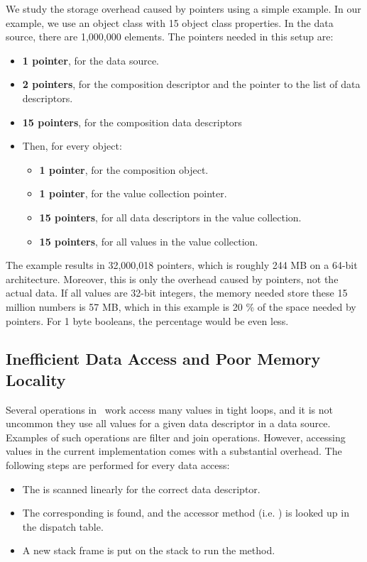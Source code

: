 We study the storage overhead caused by pointers using a simple example. In our example, we use an object class with 15 object class properties. In the data source, there are 1,000,000 elements. The pointers needed in this setup are:
\begin{itemize}
    \item \textbf{1 pointer}, for the data source.
    \item \textbf{2 pointers}, for the composition descriptor and the pointer to the list of data descriptors.
    \item \textbf{15 pointers}, for the composition data descriptors
    \item Then, for every object:
    \begin{itemize}
        \item \textbf{1 pointer}, for the composition object.
        \item \textbf{1 pointer}, for the value collection pointer.
        \item \textbf{15 pointers}, for all data descriptors in the value collection.
        \item \textbf{15 pointers}, for all values in the value collection.
    \end{itemize}
\end{itemize}
The example results in 32,000,018 pointers, which is roughly 244 MB on a 64-bit architecture. Moreover, this is only the overhead caused by pointers, not the actual data. If all values are 32-bit integers, the memory needed store these 15 million numbers is 57 MB, which in this example is 20 \% of the space needed by pointers. For 1 byte booleans, the percentage would be even less.

\subsection{Inefficient Data Access and Poor Memory Locality}
\label{sub:Inefficient Data Access and Poor Memory Locality}
Several operations in \gap~work access many values in tight loops, and it is not uncommon they use all values for a given data descriptor in a data source. Examples of such operations are filter and join operations. However, accessing values in the current implementation comes with a substantial overhead. The following steps are performed for every data access:
\begin{itemize}
    \item The  is scanned linearly for the correct data descriptor.
    \item The corresponding  is found, and the accessor method (i.e. ) is looked up in the dispatch table.
    \item A new stack frame is put on the stack to run the  method.
\end{itemize}


